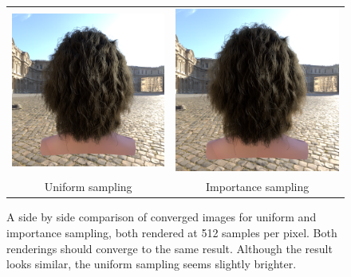 \documentclass[11pt,a4paper]{report}
\begin{document}
\begin{figure}
\begin{center}
\begin{tabular}{cc}
\includegraphics[scale=0.17]{variance-results/uniform512.png} & \includegraphics[scale=0.17]{variance-results/deon512.png} \\ 
Uniform sampling & Importance sampling \\
\end{tabular}
\end{center}
\caption{A side by side comparison of converged images for uniform and importance sampling, both rendered at 512 samples per pixel. Both renderings should converge to the same result. Although the result looks similar, the uniform sampling seems slightly brighter.}
\label{fig_sidebyside_converged}
\end{figure}
\end{document}
